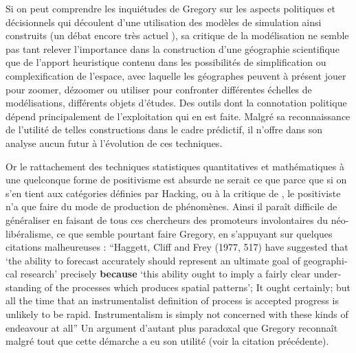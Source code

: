 
Si on peut comprendre les inquiétudes de Gregory \textcite{Gregory1978} sur les aspects politiques et décisionnels qui découlent d'une utilisation des modèles de simulation ainsi construits (un débat encore très actuel \autocite{OSullivan2004} ), sa critique de la modélisation ne semble pas tant relever l'importance dans la construction d'une géographie scientifique que de l'apport heuristique contenu dans les possibilités de simplification ou complexification de l'espace, avec laquelle les géographes peuvent à présent jouer pour zoomer, dézoomer ou utiliser pour confronter différentes échelles de modélisations, différents objets d'études. Des outils dont la connotation politique dépend principalement de l'exploitation qui en est faite. Malgré sa reconnaissance de l'utilité de telles constructions dans le cadre prédictif, il n'offre dans son analyse aucun futur à l'évolution de ces techniques.

Or le rattachement des techniques statistiques quantitatives et mathématiques à une quelconque forme de positivisme est absurde ne serait ce que parce que si on s'en tient aux catégories définies par Hacking, ou à la critique de \autocite{Dauphine2003}, le positiviste n'a que faire du mode de production de phénomènes. Ainsi il paraît difficile de généraliser en faisant de tous ces chercheurs des promoteurs involontaires du néo-libéralisme, ce que semble pourtant faire Gregory, en s'appuyant sur quelques citations malheureuses : \foreignquote{english}{Haggett, Cliff and Frey (1977, 517) have suggested that \foreignquote{english}{the ability to forecast accurately should represent an ultimate goal of geographical research} precisely \textbf{because} \foreignquote{english}{this ability ought to imply a fairly clear understanding of the processes which produces spatial patterns}; It ought certainly; but all the time that an instrumentalist definition of process is accepted progress is unlikely to be rapid. Instrumentalism is simply not concerned with these kinds of endeavour at all} \autocite[41]{Gregory1978} Un argument d'autant plus paradoxal que Gregory reconnaît malgré tout que cette démarche a eu son utilité (voir la citation précédente).


